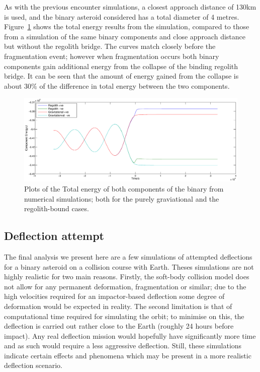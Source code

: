 \documentclass[letterpaper, preprint, paper,11pt]{AAS}	%
\begin{document}
As with the previous encounter simulations, a closest approach distance of 130km is used, and the binary asteroid considered has a total diameter of 4 metres. Figure~\ref{fig:reg} shows the total energy results from the simulation, compared to those from a simulation of the same binary components and close approach distance but without the regolith bridge. The curves match closely before the fragmentation event; however when fragmentation occurs both binary components gain additional energy from the collapse of the binding regolith bridge. It can be seen that the amount of energy gained from the collapse is about $30\%$ of the difference in total energy between the two components.
 
\begin{figure}[H]
\centering
\centerline{\includegraphics[width=1.2\textwidth]{regolith_v_gravitational.eps}} 
\caption{Plots of the Total energy of both components of the binary from numerical simulations; both for the purely graviational and the regolith-bound cases.} 
\label{fig:reg}
\end{figure}

\subsection{Deflection attempt}

The final analysis we present here are a few simulations of attempted deflections for a binary asteroid on a collision course with Earth. Theses simulations are not highly realistic for two main reasons. Firstly, the soft-body collision model does not allow for any permanent deformation, fragmentation or similar; due to the high velocities required for an impactor-based deflection some degree of deformation would be expected in reality. The second limitation is that of computational time required for simulating the orbit; to minimise on this, the deflection is carried out rather close to the Earth (roughly 24 hours before impact). Any real deflection mission would hopefully have significantly more time and as such would require a less aggressive deflection. Still, these simulations indicate certain effects and phenomena which may be present in a more realistic deflection scenario. 
\end{document}
